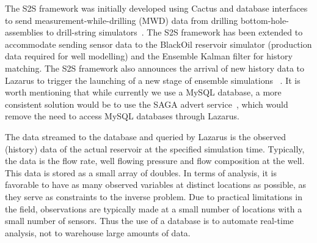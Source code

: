 \documentclass{acm_proc_article-sp}
\newcommand{\jhanote}[1]{ {\textcolor{red} { ***Jha: #1 }}}
\newcommand{\yyenote}[1]{ {\textcolor{blue} { ***yye00: #1 }}}
\newcommand{\jhanote}[1]{}
\newcommand{\yyenote}[1]{}
\begin{document}

The S2S framework was initially developed using Cactus and database
interfaces to send measurement-while-drilling (MWD) data from drilling
bottom-hole-assemblies to drill-string simulators~\cite{Duff1,
  Duff2}. The S2S framework has been extended to accommodate sending
sensor data to the BlackOil reservoir simulator (production data
required for well modelling) and the Ensemble Kalman filter for
history matching.  The S2S framework also announces the arrival of new
history data to Lazarus to trigger the launching of a new stage of
ensemble simulations ~\cite{Duff1,Duff2}.  It is worth mentioning that
while currently we use a MySQL database, a more consistent solution
would be to use the SAGA advert service~\cite{saga_sc05}, which would
remove the need to access MySQL databases through Lazarus.

The data streamed to the database and queried by Lazarus is the observed
(history) data of the actual reservoir at the specified simulation time. Typically,
the data is the flow rate, well flowing pressure and flow composition
at the well. This data is stored as a small array of doubles.
In terms of analysis, it is favorable to have as many observed variables
at distinct locations as possible, as they serve as constraints to the inverse
problem. Due to practical limitations in the field, observations are typically made at a
small number of locations with a small number of sensors. Thus the use
of a database is to automate real-time analysis, not to warehouse large amounts of data.



\end{document}

